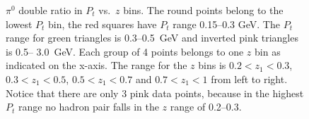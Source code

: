 \begin{figure}[t]
 \centering     \tiny
\caption[$\pi^0$ double ratio after background and thrust-smearing corrections in $P_t$ vs.~$z$ bins]{$\pi^0$ double ratio in $P_t$ vs.~$z$ bins. The round points belong to the lowest $P_t$ bin, the red squares have $P_t$ range 0.15--0.3 GeV. The $P_t$ range for green triangles is 0.3--0.5~GeV and inverted pink triangles is 0.5-- 3.0~GeV. Each group of 4 points belongs to one $z$ bin as indicated on the x-axis. The range for the $z$ bins is $0.2<z_1<0.3$,  $0.3<z_1<0.5$, $0.5<z_1<0.7$ and $0.7<z_1<1$ from left to right. Notice that there are only 3 pink data points, because in the highest $P_t$ range no hadron pair falls in the $z$ range of 0.2--0.3.}
  \label{fig:ptzresult}
\end{figure}
